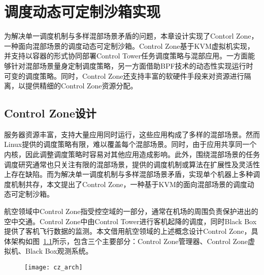 \chapter{调度动态可定制沙箱实现}\label{chap:control_zone}

为解决单一调度机制与多样混部场景矛盾的问题，本章设计实现了Contorl Zone，一种面向混部场景的调度动态可定制沙箱。Control Zone基于KVM虚拟机实现，并支持以容器的形式协同部署Control Tower任务调度策略与混部应用。一方面能够针对混部场景量身定制调度策略，另一方面借助BPF技术的动态性实现运行时可变的调度策略。同时，Control Zone还支持丰富的软硬件手段来对资源进行隔离，以提供精细的Control Zone资源分配。

\section{Control Zone设计}



服务器资源丰富，支持大量应用同时运行，这些应用构成了多样的混部场景。然而Linux提供的调度策略有限，难以覆盖每个混部场景。同时，由于应用共享同一个内核，因此调整调度策略时容易对其他应用造成影响。此外，围绕混部场景的任务调度研究通常也只关注有限的混部场景，提供的调度机制或算法在扩展性及灵活性上存在缺陷。而为解决单一调度机制与多样混部场景矛盾，实现单个机器上多种调度机制共存，本文提出了Control Zone，一种基于KVM的面向混部场景的调度动态可定制沙箱。

航空领域中Control Zone指受控空域的一部分，通常在机场的周围负责保护进出的空中交通。Control Zone中由Control Tower进行客机起降的调度，同时Black Box提供了客机飞行数据的监测。本文借用航空领域的上述概念设计Control Zone，具体架构如图~\ref{fig:cz_arch}所示，包含三个主要部分：Control Zone管理器、Control Zone虚拟机、Black Box观测系统。

\begin{figure}[!htbp]
    \centering
    \texttt{[image: cz\_arch]}
    \label{fig:cz_arch}
\end{figure}

